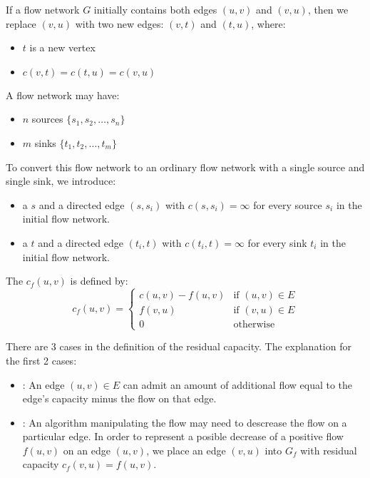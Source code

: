       \par If a flow network $G$ initially contains both edges $(u, v)$ and $(v, u)$, then we replace $(v, u)$ with two new edges: $(v, t)$ and $(t, u)$, where:
      \begin{itemize}
        \item $t$ is a new vertex
        \item $c(v, t) = c(t, u) = c(v, u)$
      \end{itemize}

      \par A flow network may have:
        \begin{itemize}
          \item $n$ sources $\{s_1, s_2, \ldots, s_n\}$
          \item $m$ sinks $\{t_1, t_2, \ldots, t_m\}$
        \end{itemize}

      \par To convert this flow network to an ordinary flow network with a single source and single sink, we introduce:
      \begin{itemize}
        \item a  $s$ and a directed edge $(s, s_i)$ with $c(s, s_i) = \infty$ for every source $s_i$ in the initial flow network.
        \item a  $t$ and a directed edge $(t_i, t)$ with $c(t_i, t) = \infty$ for every sink $t_i$ in the initial flow network.
      \end{itemize}

    \par The  $c_f (u, v)$ is defined by:
      \[
        c_f (u, v) =
          \begin{cases}
            c(u, v) - f(u, v) & \text{if } (u, v) \in E \\
            f(v, u)           & \text{if } (v, u) \in E \\
            0                 & \text{otherwise}
          \end{cases}
      \]

    \par There are 3 cases in the definition of the residual capacity. The explanation for the first 2 cases:
      \begin{itemize}
        \item {}: An edge $(u, v) \in E$ can admit an amount of additional flow equal to the edge's capacity minus the flow on that edge.
        \item {}: An algorithm manipulating the flow may need to descrease the flow on a particular edge. In order to represent a posible decrease of a positive flow $f(u, v)$ on an edge $(u, v)$, we place an edge $(v, u)$ into $G_f$ with residual capacity $c_f(v, u) = f(u, v)$.
      \end{itemize}

